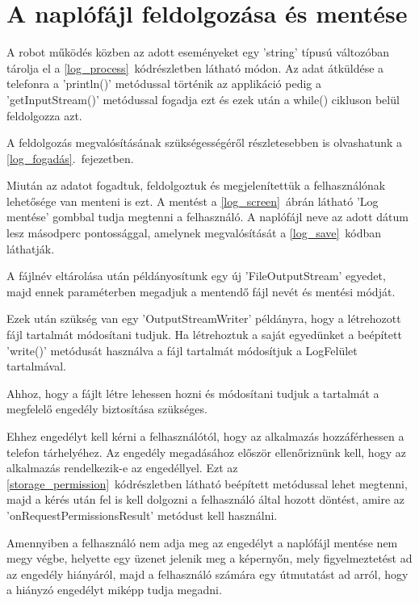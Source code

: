 \documentclass[]{thesis-ekf}
\theoremstyle{definition}
\begin{document}
\section{A naplófájl feldolgozása és mentése}

A robot működés közben az adott eseményeket egy 'string' típusú változóban tárolja el a \ref{log_process}~kódrészletben látható módon. Az adat átküldése a telefonra a 'println()' metódussal történik az applikáció pedig a 'getInputStream()' metódussal fogadja ezt és ezek után a while() cikluson belül feldolgozza azt.

A feldolgozás megvalósításának szükségességéről részletesebben is olvashatunk a \ref{log_fogadás}.~fejezetben.

Miután az adatot fogadtuk, feldolgoztuk és megjelenítettük a felhasználónak lehetősége van menteni is ezt. A mentést a \ref{log_screen}~ábrán látható 'Log mentése' gombbal tudja megtenni a felhasználó. A naplófájl neve az adott dátum lesz másodperc pontossággal, amelynek megvalósítását a \ref{log_save}~kódban láthatják.

A fájlnév eltárolása után példányosítunk egy új 'FileOutputStream' egyedet, majd ennek paraméterben megadjuk a mentendő fájl nevét és mentési módját.

Ezek után szükség van egy 'OutputStreamWriter' példányra, hogy a létrehozott fájl tartalmát módosítani tudjuk. Ha létrehoztuk a saját egyedünket a beépített 'write()' metódusát használva a fájl tartalmát módosítjuk a LogFelület tartalmával.


Ahhoz, hogy a fájlt létre lehessen hozni és módosítani tudjuk a tartalmát a megfelelő engedély biztosítása szükséges.

Ehhez engedélyt kell kérni a felhasználótól, hogy az alkalmazás hozzáférhessen a telefon tárhelyéhez. Az engedély megadásához először ellenőriznünk kell, hogy az alkalmazás rendelkezik-e az engedéllyel. Ezt az \ref{storage_permission}~kódrészletben látható beépített metódussal lehet megtenni, majd a kérés után fel is kell dolgozni a felhasználó által hozott döntést, amire az 'onRequestPermissionsResult' metódust kell használni.

Amennyiben a felhasználó nem adja meg az engedélyt a naplófájl mentése nem megy végbe, helyette egy üzenet jelenik meg a képernyőn, mely figyelmeztetést ad az engedély hiányáról, majd a felhasználó számára egy útmutatást ad arról, hogy a hiányzó engedélyt miképp tudja megadni.
\end{document}
